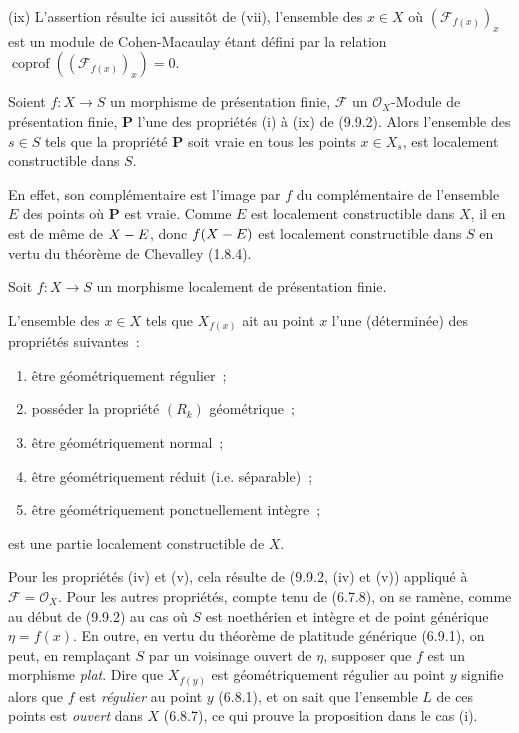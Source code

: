 (ix) L'assertion résulte ici aussitôt de (vii), l'ensemble des $x\in X$ où
$(\mathcal F_{f(x)})_x$ est un module de Cohen-Macaulay étant défini par la
relation $\operatorname{coprof}((\mathcal F_{f(x)})_x)=0$.

\begin{corollary}[9.9.3]
\label{IV.9.9.3-fr}
Soient $f:X\to S$ un morphisme de présentation finie, $\mathcal F$ un
$\mathcal O_X$-Module de présentation finie, $\boldsymbol{P}$ l'une des propriétés
\textup{(i)} à \textup{(ix)} de \textup{(9.9.2)}. Alors l'ensemble des $s\in S$ tels que la propriété
$\boldsymbol{P}$ soit vraie en tous les points $x\in X_s$, est localement
constructible dans $S$.
\end{corollary}

En effet, son complémentaire est l'image par $f$ du complémentaire de
l'ensemble $E$ des points où $\boldsymbol{P}$ est vraie. Comme $E$ est localement
constructible dans $X$, il en est de même de $X- E$, donc $f(X- E)$ est
localement constructible dans $S$ en vertu du théorème de Chevalley (1.8.4).

\begin{proposition}[9.9.4]
\label{IV.9.9.4-fr}
Soit $f:X\to S$ un morphisme localement de présentation finie.

L'ensemble des
$x\in X$ tels que $X_{f(x)}$ ait au point $x$ l'une (déterminée) des propriétés
suivantes~:
\begin{enumerate}
\item[\textup{(i)}] être géométriquement régulier~;
\item[\textup{(ii)}] posséder la propriété $(R_k)$ géométrique~;
\item[\textup{(iii)}] être géométriquement normal~;
\item[\textup{(iv)}] être géométriquement réduit \textup{(i.e.} séparable\textup{)}~;
\item[\textup{(v)}] être géométriquement ponctuellement intègre~;
\end{enumerate}
est une partie localement constructible de $X$.
\end{proposition}

Pour les propriétés (iv) et (v), cela résulte de (9.9.2, (iv) et (v)) appliqué à
$\mathcal F=\mathcal O_X$. Pour les autres propriétés, compte tenu de (6.7.8),
on se ramène, comme au début de (9.9.2) au cas où $S$ est noethérien et intègre
et de point générique $\eta=f(x)$. En outre, en vertu du théorème de platitude
générique (6.9.1), on peut, en remplaçant $S$ par un voisinage ouvert de
$\eta$, supposer que $f$ est un morphisme \emph{plat}. Dire que $X_{f(y)}$ est
géométriquement régulier au point $y$ signifie alors que $f$ est
\emph{régulier} au point $y$ (6.8.1), et on sait que l'ensemble $L$ de ces
points est \emph{ouvert} dans $X$ (6.8.7), ce qui prouve la proposition dans le
cas (i).


